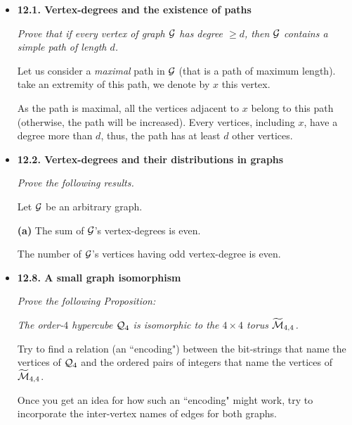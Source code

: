 \begin{itemize}
\item
{\bf 12.1. Vertex-degrees and the existence of paths}
\smallskip

{\em Prove that if every vertex of graph $\mbox{$\cal G$}$ has degree $\geq d$, then $\mbox{$\cal G$}$ contains a {\em simple} path of length $d$.}
\smallskip

Let us consider a \textit{maximal} path in $\mbox{$\cal G$}$ (that is a path of maximum length). 
take an extremity of this path, we denote by $x$ this vertex.

As the path is maximal, all the vertices adjacent to $x$ belong to this path (otherwise, the path will be increased).
Every vertices, including $x$, have a degree more than $d$, thus, the path has at least $d$ other vertices.

\medskip\item
{\bf 12.2. Vertex-degrees and their distributions in graphs}
\smallskip

{\em Prove the following results.}

\begin{prop}
Let $\mbox{$\cal G$}$ be an arbitrary graph.
\smallskip

\noindent
{\bf (a)} The sum of $\mbox{$\cal G$}$'s vertex-degrees is even.
\smallskip

The number of $\mbox{$\cal G$}$'s vertices having odd vertex-degree is even.
\end{prop}

\medskip\item
{\bf 12.8. A small graph isomorphism}
\smallskip

{\em Prove the following Proposition:}
\smallskip

{\em The order-$4$ hypercube $\mbox{$\cal Q$}_4$ is \textit{isomorphic} to the $4 \times 4$ torus $\widetilde{\mbox{$\cal M$}}_{4,4}$.}
\smallskip

Try to find a relation (an ``encoding") between the bit-strings that name the vertices of $\mbox{$\cal Q$}_4$ and the ordered pairs of integers that name the vertices of $\widetilde{\mbox{$\cal M$}}_{4,4}$.

\smallskip 

Once you get an idea for how such an ``encoding" might work, try to incorporate the inter-vertex names of edges for both graphs.
\medskip


\end{itemize}
